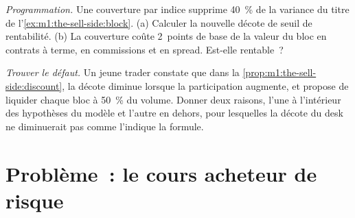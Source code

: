 \begin{exercise}[$\star\star\star$]\label{exo:m1:the-sell-side:7}
\emph{Programmation.} Une couverture par indice supprime 40~\% de la variance du titre de
l'\cref{ex:m1:the-sell-side:block}. (a) Calculer la nouvelle décote de seuil de rentabilité.
(b) La couverture coûte 2~points de base de la valeur du bloc en contrats à terme,
en commissions et en spread. Est-elle rentable~?
\end{exercise}

\begin{exercise}[$\star\star\star$]\label{exo:m1:the-sell-side:8}
\emph{Trouver le défaut.} Un jeune trader constate que dans la
\cref{prop:m1:the-sell-side:discount}, la décote diminue lorsque la participation augmente,
et propose de liquider chaque bloc à 50~\% du volume. Donner deux raisons, l'une à l'intérieur
des hypothèses du modèle et l'autre en dehors, pour lesquelles la décote du desk ne diminuerait pas
comme l'indique la formule.
\end{exercise}

\section{Problème~: le cours acheteur de risque}

